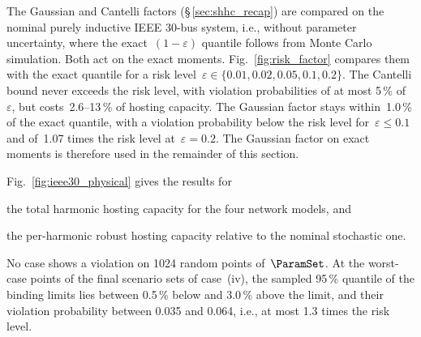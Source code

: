 The Gaussian and Cantelli factors (\S\,\ref{sec:shhc_recap}) are compared on the nominal purely inductive IEEE 30-bus system, i.e., without parameter uncertainty, where the exact~$(1-\varepsilon)$ quantile follows from Monte Carlo simulation. Both act on the exact moments. Fig.~\ref{fig:risk_factor} compares them with the exact quantile for a risk level~$\varepsilon \in \{0.01, 0.02, 0.05, 0.1, 0.2\}$. The Cantelli bound never exceeds the risk level, with violation probabilities of at most 5\,\% of~$\varepsilon$, but costs~2.6--13\,\% of hosting capacity. The Gaussian factor stays within~1.0\,\% of the exact quantile, with a violation probability below the risk level for~$\varepsilon \leq 0.1$ and of~1.07 times the risk level at~$\varepsilon = 0.2$. The Gaussian factor on exact moments is therefore used in the remainder of this section.

Fig.~\ref{fig:ieee30_physical} gives the results for
\begin{enumerate*}
    \item [(a)] the total harmonic hosting capacity for the four network models, and
    \item [(b)] the per-harmonic robust hosting capacity relative to the nominal stochastic one.
\end{enumerate*}
No case shows a violation on 1024 random points of~$\ParamSet$. At the worst-case points of the final scenario sets of case~(iv), the sampled 95\,\% quantile of the binding limits lies between 0.5\,\% below and 3.0\,\% above the limit, and their violation probability between 0.035 and 0.064, i.e., at most 1.3 times the risk level.

